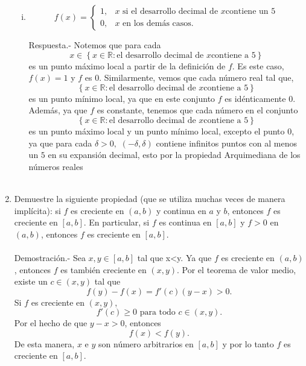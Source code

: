 \begin{enumerate}[\bfseries 1.]
\begin{enumerate}[(i)]
	    \item \;
	    $$f(x)=\left\{\begin{array}{rl}
		    1, & x \mbox{ si el desarrollo decimal de } x \mbox{contiene un } 5\\
		    0, &x \mbox{ en los demás casos}.
	    \end{array}\right.$$
	    \vspace{0.4cm}

		Respuesta.-\; Notemos que para cada
		$$x\in \left\{x\in \mathbb{R}:\mbox{el desarrollo decimal de } x \mbox{contiene a } 5\right\}$$
		es un punto máximo local a partir de la definición de $f$. Es este caso, $f(x)=1$ y $f$ es $0$. Similarmente, vemos que cada número real tal que, 
		$$\left\{x\in \mathbb{R}:\mbox{el desarrollo decimal de } x \mbox{contiene a } 5\right\}$$
		es un punto mínimo local, ya que en este conjunto $f$ es idénticamente $0$. Además, ya que $f$ es constante, tenemos que cada número en el conjunto 
		$$\left\{x\in \mathbb{R}:\mbox{el desarrollo decimal de } x \mbox{contiene a } 5\right\}$$
		es un punto máximo local y un punto mínimo local, excepto el punto $0$, ya que para cada $\delta>0,$ $(-\delta,\delta)$ contiene infinitos puntos con al menos un $5$ en su expansión decimal, esto por la propiedad Arquimediana de los números reales\\\\

	\end{enumerate}

    \item Demuestre la siguiente propiedad (que se utiliza muchas veces de manera implícita): si $f$ es creciente en $(a, b)$ y continua en $a$ y $b$, entonces $f$ es creciente en $[a, b]$. En particular, si $f$ es continua en $[a, b]$ y $f > 0$ en $(a, b)$, entonces $f$ es creciente en $[a, b]$.\\\\
	Demostración.-\; Sea $x,y\in [a,b]$ tal que x<y. Ya que $f$ es creciente en $(a,b)$, entonces $f$ es también creciente en $(x,y)$. Por el teorema de valor medio, existe un $c\in (x,y)$ tal que 
	$$f(y)-f(x)=f'(c)(y-x)>0.$$
	Si $f$ es creciente en $(x,y)$,
	$$f'(c)\geq 0 \mbox{ para todo } c\in (x,y).$$
	Por el hecho de que $y-x>0$, entonces
	$$f(x)<f(y).$$
	De esta manera, $x$ e $y$ son número arbitrarios en $[a,b]$ y por lo tanto $f$ es creciente en $[a,b]$.\\\\


\end{enumerate}
